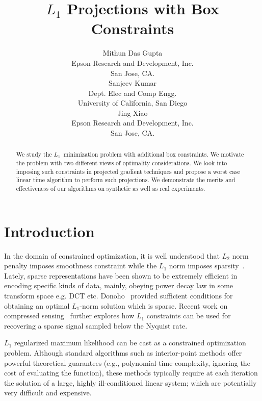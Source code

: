\documentclass{article}
\title{$L_1$ Projections with Box Constraints}
\author{
Mithun Das Gupta  \\
Epson Research and Development, Inc. \\
San Jose, CA.\\
\And
Sanjeev Kumar \\
Dept. Elec and Comp Engg. \\
University of California, San Diego \\
\And
Jing Xiao \\
Epson Research and Development, Inc. \\
San Jose, CA. \\
}
\def\Lo{$L_1$~}
\begin{document}
\maketitle

\begin{abstract}
We study the \Lo minimization problem with additional box constraints. We motivate the problem with two different views of optimality considerations. We look into imposing such constraints in projected gradient techniques and propose a worst case linear time algorithm to perform such projections.
We demonstrate the merits and effectiveness
of our algorithms on synthetic as well as real experiments.
\end{abstract}


\section{Introduction}
In the domain of constrained optimization, it is well understood that $L_2$ norm penalty imposes smoothness constraint while the $L_1$ norm imposes sparsity~\cite{Ng04}. Lately, sparse representations have been shown to be extremely efficient in encoding specific kinds of data, mainly, obeying power decay law in some transform space e.g. DCT etc. Donoho~\cite{Donoho04} provided sufficient conditions for obtaining an optimal $L_1$-norm solution which is sparse. Recent
work on compressed sensing~\cite{Candes06,Tsaig06} further explores how $L_1$ constraints can be used for recovering a sparse signal sampled below the Nyquist rate.

$L_1$ regularized maximum likelihood can be cast as a constrained optimization problem. Although standard algorithms such as interior-point methods \cite{Tibshirani94,Koh07} offer powerful theoretical guarantees (e.g., polynomial-time complexity, ignoring the cost of evaluating the function), these methods typically require at each iteration the solution of a large, highly ill-conditioned linear system; which are potentially very difficult and expensive.
\end{document}

